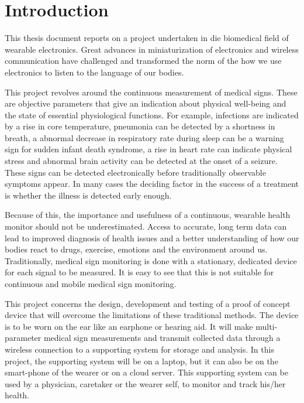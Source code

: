 \chapter{Introduction}
\label{chp:Intro}
This thesis document reports on a project undertaken in die biomedical field of wearable electronics. Great advances in miniaturization of electronics and wireless communication have challenged and transformed the norm of the how we use electronics to listen to the language of our bodies.

\medskip
This project revolves around the continuous measurement of medical signs. These are objective parameters that give an indication about physical well-being and the state of essential physiological functions. For example, infections are indicated by a rise in core temperature, pneumonia can be detected by a shortness in breath, a abnormal decrease in respiratory rate during sleep can be a warning sign for sudden infant death syndrome, a rise in heart rate can indicate physical stress and abnormal brain activity can be detected at the onset of a seizure. These signs can be detected electronically before traditionally observable symptoms appear. In many cases the deciding factor in the success of a treatment is whether the illness is detected early enough.

\medskip
Because of this, the importance and usefulness of a continuous, wearable health monitor should not be underestimated. Access to accurate, long term data can lead to improved diagnosis of health issues and a better understanding of how our bodies react to drugs, exercise, emotions and the environment around us. Traditionally, medical sign monitoring is done with a stationary, dedicated device for each signal to be measured. It is easy to see that this is not suitable for continuous and mobile medical sign monitoring.

\medskip
This project concerns the design, development and testing of a proof of concept device that will overcome the limitations of these traditional methods. The device is to be worn on the ear like an earphone or hearing aid. It will make multi-parameter medical sign measurements and transmit collected data through a wireless connection to a supporting system for storage and analysis. In this project, the supporting system will be on a laptop, but it can also be on the smart-phone of the wearer or on a cloud server. This supporting system can be used by a physician, caretaker or the wearer self, to monitor and track his/her health.


